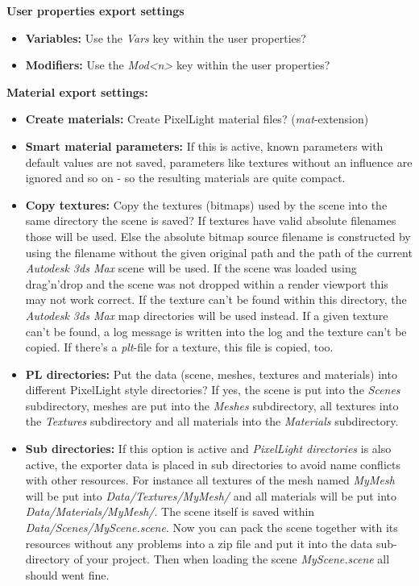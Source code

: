 \textbf{User properties export settings}
\begin{itemize}
\item{\textbf{Variables:} Use the \emph{Vars} key within the user properties?}
\item{\textbf{Modifiers:} Use the \emph{Mod<n>} key within the user properties?}
\end{itemize}

\textbf{Material export settings:}
\begin{itemize}
\item{\textbf{Create materials:} Create PixelLight material files? (\emph{mat}-extension)}
\item{\textbf{Smart material parameters:} If this is active, known parameters with default values are not saved, parameters like textures without an influence are ignored and so on - so the resulting materials are quite compact.}
\item{\textbf{Copy textures:} Copy the textures (bitmaps) used by the scene into the same directory the scene is saved? If textures have valid absolute filenames those will be used. Else the absolute bitmap source filename is constructed by using the filename without the given original path and the path of the current \emph{Autodesk 3ds Max} scene will be used. If the scene was loaded using drag'n'drop and the scene was not dropped within a render viewport this may not work correct. If the texture can't be found within this directory, the \emph{Autodesk 3ds Max} map directories will be used instead. If a given texture can't be found, a log message is written into the log and the texture can't be copied. If there's a \emph{plt}-file for a texture, this file is copied, too.}
\item{\textbf{PL directories:} Put the data (scene, meshes, textures and materials) into different PixelLight style directories? If yes, the scene is put into the \emph{Scenes} subdirectory, meshes are put into the \emph{Meshes} subdirectory, all textures into the \emph{Textures} subdirectory and all materials into the \emph{Materials} subdirectory.}
\item{\textbf{Sub directories:} If this option is active and \emph{PixelLight directories} is also active, the exporter data is placed in sub directories to avoid name conflicts with other resources. For instance all textures of the mesh named \emph{MyMesh} will be put into \emph{Data/Textures/MyMesh/} and all materials will be put into \emph{Data/Materials/MyMesh/}. The scene itself is saved within \emph{Data/Scenes/MyScene.scene}. Now you can pack the scene together with its resources without any problems into a zip file and put it into the data sub-directory of your project. Then when loading the scene \emph{MyScene.scene} all should went fine.}
\end{itemize}


